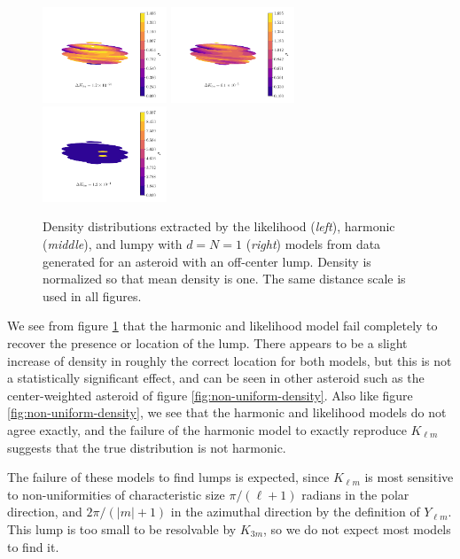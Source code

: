 \documentclass[fleqn,usenatbib]{mnras}
\begin{document}
\begin{figure}
  \centering
  \includegraphics[width=0.33\textwidth]{figs/blob-likelihood.pdf}\hfill
  \includegraphics[width=0.33\textwidth]{figs/blob-harmonic.pdf}\hfill
  \includegraphics[width=0.33\textwidth]{figs/blob-lumpy.pdf}

  \caption{Density distributions extracted by the likelihood (\textit{left}), harmonic (\textit{middle}), and lumpy with $d=N=1$ (\textit{right}) models from data generated for an asteroid with an off-center lump. Density is normalized so that mean density is one. The same distance scale is used in all figures.}
  \label{fig:blob-density}
\end{figure}

We see from figure \ref{fig:blob-density} that the harmonic and likelihood model fail completely to recover the presence or location of the lump. There appears to be a slight increase of density in roughly the correct location for both models, but this is not a statistically significant effect, and can be seen in other asteroid such as the center-weighted asteroid of figure \ref{fig:non-uniform-density}. Also like figure \ref{fig:non-uniform-density}, we see that the harmonic and likelihood models do not agree exactly, and the failure of the harmonic model to exactly reproduce $K_{\ell m}$ suggests that the true distribution is not harmonic.

The failure of these models to find lumps is expected, since $K_{\ell m}$ is most sensitive to non-uniformities of characteristic size $\pi/(\ell + 1)$ radians in the polar direction, and $2\pi / (|m|+1)$ in the azimuthal direction by the definition of $Y_{\ell m}$. This lump is too small to be resolvable by $K_{3m}$, so we do not expect most models to find it.
\end{document}
